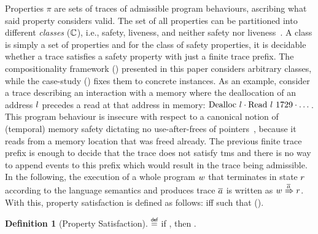 \documentclass[dvipsnames,conference]{IEEEtran}
\theoremstyle{definition}
\newtheorem{definition}{Definition}[section]
\begin{document}
Properties $\pi$ are sets of traces of admissible program behaviours, ascribing what said property considers valid.
The set of all properties can be partitioned into different {\em classes} ($\mathbb{C}$), i.e., safety, liveness, and neither safety nor liveness~\cite{clarkson2008hyper}.
A class is simply a set of properties and for the class of safety properties, it is decidable whether a trace satisfies a safety property with just a finite trace prefix.
The compositionality framework () presented in this paper considers arbitrary classes, while the case-study () fixes them to concrete instances.
As an example, consider a trace describing an interaction with a memory where the deallocation of an address $l$ precedes a read at that address in memory: $\ev{Dealloc\ \loc}\cdot\ev{Read\ \loc\ 1729}\cdot\dots$.
This program behaviour is insecure with respect to a canonical notion of (temporal) memory safety dictating no use-after-frees of pointers~\cite{nagarakatte2010cets,azevedo2018meaningsofms}, because it reads from a memory location that was freed already.
The previous finite trace prefix is enough to decide that the trace does not satisfy \gls*{tms} and there is no way to append events to this prefix which would result in the trace being admissible.
In the following, the execution of a whole program $w$ that terminates in state $r$ according to the language semantics and produces trace $\overline{a}$ is written as $\progstepto{\wholeprogvar}{\runtimetermvar}{\trace}$.
With this, property satisfaction is defined as follows:
 iff  such that  ().

\begin{definition}[Property Satisfaction]\label{def:propsat}
    \bul{$\sat{\progvar}{\pi}$}
    $\isdef$
    if \iul{$\forall\runtimetermvar\ \trace,\progstepto{\progvar}{\runtimetermvar}{\trace}$},
    then \oul{$\trace\in\pi$}.
\end{definition}
\end{document}
